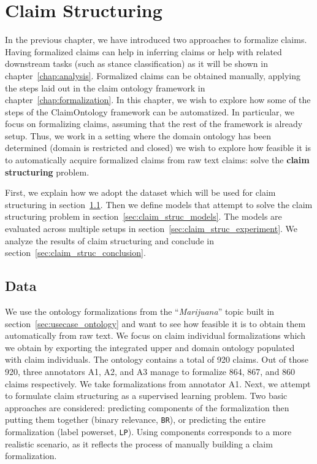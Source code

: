 \chapter{Claim Structuring}
\label{chap:claim_structuring}

In the previous chapter, we have introduced two approaches to formalize 
claims.  Having formalized claims can help in inferring claims
or help with related downstream tasks (such as stance classification) as it
will be shown in chapter~\ref{chap:analysis}.
Formalized claims can be obtained manually, applying the steps laid out in the 
claim ontology framework in chapter~\ref{chap:formalization}. 
In this chapter, we wish to explore how some of the steps of the ClaimOntology
framework can be automatized. 
In particular, we focus on formalizing 
claims, assuming that the rest of the framework is already setup. 
Thus, we work in a setting where the domain ontology has been determined (domain is
restricted and closed) we wish to explore how feasible it is to automatically
acquire formalized claims from raw text claims: solve the \textbf{claim structuring}
problem.

First, we explain how we adopt the dataset which will be used for claim
structuring in section~\ref{sec:claim_struc_data}.  Then we define models that
attempt to solve the claim structuring problem in
section~\ref{sec:claim_struc_models}.  The models are evaluated across multiple
setups in section~\ref{sec:claim_struc_experiment}. We analyze the results of
claim structuring and conclude in section~\ref{sec:claim_struc_conclusion}. 

\section{Data}
\label{sec:claim_struc_data}

We use the ontology formalizations from the 
``\emph{Marijuana}'' topic built in section~\ref{sec:usecase_ontology} and 
want to see how feasible it is to obtain them automatically from raw text.
We focus on claim individual formalizations which we obtain by exporting
the integrated upper and domain ontology populated with claim individuals. 
The ontology contains a total of 920 claims. Out of those 920, three annotators 
A1, A2, and A3 manage to formalize 864, 867, and 860 claims respectively.
We take formalizations from annotator A1. 
Next, we attempt to formulate claim structuring as a supervised learning
problem.  Two basic approaches are considered: predicting components of the
formalization then putting them together (binary relevance, \texttt{BR}), or
predicting the entire formalization (label powerset, \texttt{LP}). 
Using components corresponds to a more realistic scenario, as it reflects 
the process of manually building a claim formalization. 

